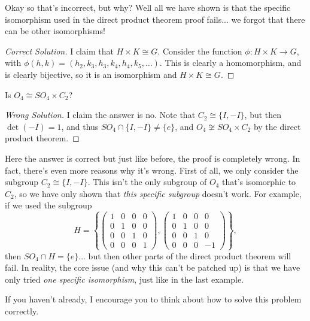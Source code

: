 \documentclass[11pt]{article}
\begin{document}
Okay so that's incorrect, but why? Well all we have shown is that the specific isomorphism used in the direct product theorem proof fails... we forgot that there can be other isomorphisms! 

\begin{proof}[{\color{ForestGreen}Correct Solution}]
	I claim that $H \times K \cong G$. Consider the function $\phi: H \times K \rightarrow G$, with $\phi(h, k) = (h_2, k_3, h_3, k_4, h_4, k_5, \dots)$. This is clearly a homomorphism, and is clearly bijective, so it is an isomorphism and $H \times K \cong G$.
\end{proof}


\begin{example}
	Is $O_4 \cong SO_4 \times C_2$?
\end{example}
\begin{proof}[{\color{Maroon}Wrong Solution}]
	I claim the answer is no. Note that $C_2 \cong \{I , -I \}$, but then $\det(-I) = 1$, and thus $SO_4 \cap \{I , -I \} \neq \{e\}$, and $O_4 \not \cong SO_4 \times C_2$ by the direct product theorem.
\end{proof}

Here the answer is correct but just like before, the proof is completely wrong. In fact, there's even more reasons why it's wrong. First of all, we only consider the subgroup $C_2 \cong \{I, -I \}$. This isn't the only subgroup of $O_4$ that's isomorphic to $C_2$, so we have only shown that \emph{this specific subgroup} doesn't work. For example, if we used the subgroup
$$
H =  \left \{ \begin{pmatrix}
	1 & 0 & 0 & 0 \\
	0 & 1 & 0 & 0 \\
	0 & 0 & 1 & 0 \\
	0 & 0 & 0 & 1
\end{pmatrix}, \begin{pmatrix}
	1 & 0 & 0 & 0 \\
	0 & 1 & 0 & 0 \\
	0 & 0 & 1 & 0 \\
	0 & 0 & 0 & -1
\end{pmatrix}\right\},$$
then $SO_4 \cap H = \{e\}$... but then other parts of the direct product theorem will fail. In reality, the core issue (and why this can't be patched up) is that we have only tried \emph{one specific isomorphism}, just like in the last example.

If you haven't already, I encourage you to think about how to solve this problem correctly.
\end{document}
